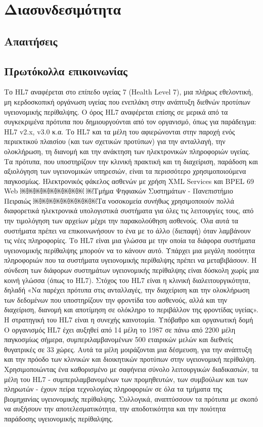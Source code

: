 \graphicspath{ {Figures/interoperability/} }
\chapter{Διασυνδεσιμότητα}\label{ch:Interoperability}
\section{Απαιτήσεις}

\section{Πρωτόκολλα επικοινωνίας}

Το HL7 αναφέρεται στο επίπεδο υγείας 7 (Health Level 7), μια πλήρως εθελοντική, μη κερδοσκοπική οργάνωση υγείας που ενεπλάκη στην ανάπτυξη διεθνών προτύπων υγειονομικής περίθαλψης. Ο όρος HL7 αναφέρεται επίσης σε μερικά από τα συγκεκριμένα πρότυπα που δημιουργούνται από τον οργανισμό, όπως για παράδειγμα: HL7 v2.x, v3.0 κ.α.
Το HL7 και τα μέλη του αφιερώνονται στην παροχή ενός περιεκτικού πλαισίου (και των σχετικών προτύπων) για την ανταλλαγή, την ολοκλήρωση, τη διανομή και την ανάκτηση των ηλεκτρονικών πληροφοριών υγείας. Τα πρότυπα, που υποστηρίζουν την κλινική πρακτική και τη διαχείριση, παράδοση και αξιολόγηση των υγειονομικών υπηρεσιών, είναι τα περισσότερο χρησιμοποιούμενα παγκοσμίως.
Ηλεκτρονικός φάκελος ασθενών με χρήση XML Services και BPEL 69 Web
￼￼￼￼￼￼￼￼￼
￼Τμήμα Ψηφιακών Συστημάτων - Πανεπιστήμιο Πειραιώς
￼￼￼￼￼￼￼￼￼Τα νοσοκομεία συνήθως χρησιμοποιούν πολλά διαφορετικά ηλεκτρονικά υπολογιστικά συστήματα για όλες τις λειτουργίες τους, από την τιμολόγηση των αρχείων μέχρι την παρακολούθηση ασθενούς. Όλα αυτά τα συστήματα πρέπει να επικοινωνήσουν το ένα με το άλλο (διεπαφή) όταν λαμβάνουν τις νέες πληροφορίες. Το HL7 είναι μια γλώσσα με την οποία τα διάφορα συστήματα υγειονομικής περίθαλψης μπορούν να το κάνουν αυτό. Υπάρχει μια μεγάλη ποσότητα πληροφοριών που τα συστήματα υγειονομικής περίθαλψης πρέπει να μεταβιβάσουν. Η σύνδεση των διάφορων συστημάτων υγειονομικής περίθαλψης είναι δύσκολη χωρίς μια κοινή γλώσσα (όπως το HL7).
Στόχος του HL7 είναι η κλινική διαλειτουργικότητα, δηλαδή «Να παρέχει πρότυπα στις ανταλλαγές, την διαχείριση και την ολοκλήρωση των δεδομένων που υποστηρίζουν την φροντίδα του ασθενούς, αλλά και την διαχείριση, διανομή και αποτίμηση σε ολόκληρο το περιβάλλον της φροντίδας υγείας». Η στρατηγική του HL7 είναι η συνεχής καινοτομία.
Υπόβαθρο και οργανωτική δομή
Ο οργανισμός HL7 έχει αυξηθεί από 14 μέλη το 1987 σε πάνω από 2200 μέλη παγκοσμίως σήμερα, συμπεριλαμβανομένων 500 εταιρικών μελών και διεθνείς θυγατρικές σε 33 χώρες. Αυτά τα μέλη μοιράζονται μια δέσμευση, για την ανάπτυξη και την πρόοδο των κλινικών και διοικητικών προτύπων στην υγειονομική περίθαλψη. Χρησιμοποιώντας ένα καθορισμένο με σαφήνεια σύνολο λειτουργικών διαδικασιών, τα μέλη του HL7 - συμπεριλαμβανομένων των προμηθευτών, των συμβούλων και των πληρωτών - έχουν πείρα τεχνολογίας πληροφοριών σε όλα τα τμήματα της βιομηχανίας υγειονομικής περίθαλψης. Συλλογικά, αναπτύσσουν τα πρότυπα με σκοπό να αυξήσουν την αποτελεσματικότητα, την αποδοτικότητα και την ποιότητα παράδοσης υγειονομικής περίθαλψης.
